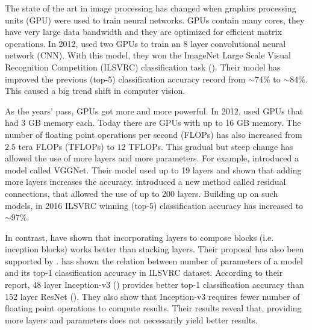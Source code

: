 
The state of the art in image processing has changed when graphics processing units (GPU) were used to train neural networks. GPUs contain many cores, they have very large data bandwidth and they are optimized for efficient matrix operations. In 2012, \cite{krizhevsky2012imagenet} used two GPUs to train an 8 layer convolutional neural network (CNN). With this model, they won the ImageNet Large Scale Visual Recognition Competition (ILSVRC) classification task (\cite{deng2012image}). Their model has improved the previous (top-5) classification accuracy record from $\sim 74\%$ to $\sim 84\%$. This caused a big trend shift in computer vision. 

As the years' pass, GPUs got more and more powerful. In 2012, \cite{krizhevsky2012imagenet} used GPUs that had 3 GB memory each. Today there are GPUs with up to 16 GB memory. The number of floating point operations per second (FLOPs) has also increased from $2.5$ tera FLOPs (TFLOPs) to $12$ TFLOPs. This gradual but steep change has allowed the use of more layers and more parameters. For example, \cite{Simonyan:2014aa} introduced a model called VGGNet. Their model used up to 19 layers and shown that adding more layers increases the accuracy. \cite{He:2015aa} introduced a new method called residual connections, that allowed the use of up to 200 layers. Building up on such models, in 2016 ILSVRC winning (top-5) classification accuracy has increased to $\sim 97\%$. 

In contrast, \cite{Szegedy:2014aa} have shown that incorporating layers to compose blocks (i.e. inception blocks) works better than stacking layers. Their proposal has also been supported by \cite{Canziani:2016aa}. \cite{Canziani:2016aa} has shown the relation between number of parameters of a model and its top-1 classification accuracy in ILSVRC dataset. According to their report, 48 layer Inception-v3 (\cite{Szegedy_2016_CVPR}) provides better top-1 classification accuracy than 152 layer ResNet (\cite{He:2015aa}). They also show that Inception-v3 requires fewer number of floating point operations to compute results. Their results reveal that, providing more layers and parameters does not necessarily yield better results. 

